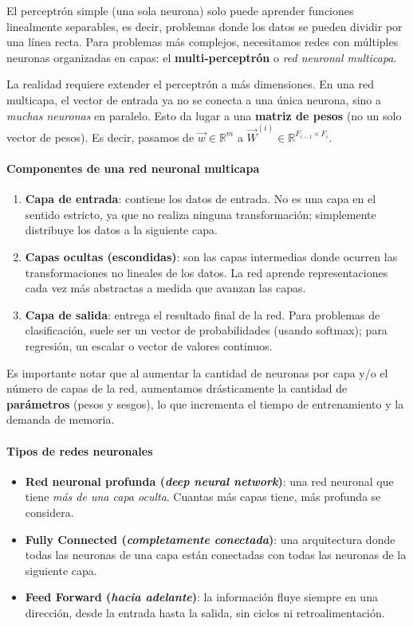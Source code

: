 El perceptrón simple (una sola neurona) solo puede aprender funciones linealmente separables, es decir, problemas donde los datos se pueden dividir por una línea recta. Para problemas más complejos, necesitamos redes con múltiples neuronas organizadas en capas: el \textbf{multi-perceptrón} o \emph{red neuronal multicapa}.

La realidad requiere extender el perceptrón a más dimensiones. En una red multicapa, el vector de entrada ya no se conecta a una única neurona, sino a \emph{muchas neuronas} en paralelo. Esto da lugar a una \textbf{matriz de pesos} (no un solo vector de pesos). Es decir, pasamos de $\vec{w} \in \mathbb{R}^m$ a $\vec{W}^{(i)} \in \mathbb{R}^{F_{i-1} \times F_{i}}$.

\paragraph{Componentes de una red neuronal multicapa}

\begin{enumerate}
  \item \textbf{Capa de entrada}: contiene los datos de entrada. No es una capa en el sentido estricto, ya que no realiza ninguna transformación; simplemente distribuye los datos a la siguiente capa.
  \item \textbf{Capas ocultas (escondidas)}: son las capas intermedias donde ocurren las transformaciones no lineales de los datos. La red aprende representaciones cada vez más abstractas a medida que avanzan las capas.
  \item \textbf{Capa de salida}: entrega el resultado final de la red. Para problemas de clasificación, suele ser un vector de probabilidades (usando softmax); para regresión, un escalar o vector de valores continuos.
\end{enumerate}

Es importante notar que al aumentar la cantidad de neuronas por capa y/o el número de capas de la red, aumentamos drásticamente la cantidad de \textbf{parámetros} (pesos y sesgos), lo que incrementa el tiempo de entrenamiento y la demanda de memoria.

\paragraph{Tipos de redes neuronales}

\begin{itemize}
\item \textbf{Red neuronal profunda (\textit{deep neural network})}: una red neuronal que tiene \emph{más de una capa oculta}. Cuantas más capas tiene, más profunda se considera.

\item \textbf{Fully Connected (\textit{completamente conectada})}: una arquitectura donde todas las neuronas de una capa están conectadas con todas las neuronas de la siguiente capa.

\item \textbf{Feed Forward (\textit{hacia adelante})}: la información fluye siempre en una dirección, desde la entrada hasta la salida, sin ciclos ni retroalimentación.
\end{itemize}

